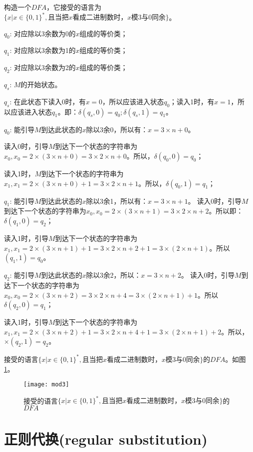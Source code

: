 \begin{example}
	构造一个$DFA$，它接受的语言为$\{x|x\in \{0,1\}^{\ast}, \text{且当把$x$看成二进制数时，$x$模3与0同余}\}$。 
	
	$q_0$: 对应除以3余数为0的$x$组成的等价类；
	
	$q_1$: 对应除以3余数为1的$x$组成的等价类；
	
	$q_2$: 对应除以3余数为2的$x$组成的等价类；
	
	$q_s$: $M$的开始状态。
	
	$q_s$: 在此状态下读入0时，有$x=0$，所以应该进入状态$q_0$；读入1时，有$x=1$，所以应该进入状态$q_1$。即：$\delta(q_s,0)= q_0; δ(q_s,1)= q_1$。
	
	$q_0$: 能引导$M$到达此状态的$x$除以3余0，所以有：$x=3\times n+0$。
	
	读入0时，引导$M$到达下一个状态的字符串为$x_0,x_0=2\times(3\times n+0)=3\times 2\times n+0$。所以，$\delta(q_0,0)= q_0$；
	
	读入1时，$M$到达下一个状态的字符串为$x_1,x_1=2\times(3\times n+0)+1=3\times 2\times n+1$。所以，$\delta(q_0,1)= q_1$；
	
	$q_1$: 能引导$M$到达此状态的$x$除以3余1，所以有：$x=3\times n+1$。
	读入0时，引导$M$到达下一个状态的字符串为$x_0,x_0=2\times(3\times n+1)=3\times 2\times n+2$。所以即：$\delta(q_1,0)= q_2$；
	
	读入1时，引导$M$到达下一个状态的字符串为$x_1,x_1=2\times(3\times n+1)+1=3\times 2\times n+2+1=3\times(2\times n+1)$。所以$(q_1,1)= q_0$。 
	
	$q_2$: 能引导$M$到达此状态的$x$除以3余2，所以：$x=3\times n+2$。
	读入0时，引导$M$到达下一个状态的字符串为$x_0,x_0=2\times (3\times n+2)=3\times 2\times n+4=3\times(2\times n+1)+1$。所以$\delta(q_2,0)= q_1$；
	
	读入1时，引导$M$到达下一个状态的字符串为$x_1,x_1=2\times(3\times n+2)+1=3\times 2\times n+4+1=3\times(2\times n+1)+2$。所以，$\times(q_2,1)= q_2$。
	
	接受的语言$\{x|x\in \{0,1\}^{\ast}, \text{且当把$x$看成二进制数时，$x$模3与0同余}\}$的$DFA$。如图\ref{fig:mod3}。 
	
	\begin{figure}[htbp]
		\texttt{[image: mod3]}
		\caption{接受的语言$\{x|x\in \{0,1\}^{\ast}, \text{且当把$x$看成二进制数时，$x$模3与0同余}\}$的$DFA$}
		\label{fig:mod3}       %
	\end{figure}
\end{example}

\section{正则代换(regular substitution)}

